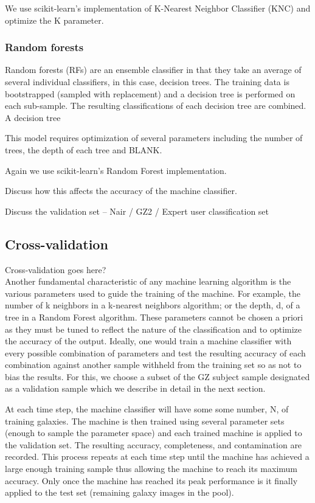 \documentclass[twocolumn]{aastex6}
\begin{document}
We use scikit-learn's implementation of K-Nearest Neighbor Classifier (KNC) and optimize the K parameter. 

\subsubsection{Random forests}
Random forests (RFs) are an ensemble classifier in that they take an average of several individual classifiers, in this case, decision trees. The training data is bootstrapped (sampled with replacement) and a decision tree is performed on each sub-sample. The resulting classifications of each decision tree are combined. A decision tree 


This model requires optimization of several parameters including the number of trees, the depth of each tree and BLANK. 

Again we use scikit-learn's Random Forest implementation. 


Discuss how this affects the accuracy of the machine classifier. 

Discuss the validation set -- Nair / GZ2 / Expert user classification set


\subsection{Cross-validation}
Cross-validation goes here? \\
Another fundamental characteristic of any machine learning algorithm is the various parameters used to guide the training of the machine. For example, the number of k neighbors in a k-nearest neighbors algorithm; or the depth, d, of a tree in a Random Forest algorithm. These parameters cannot be chosen a priori as they must be tuned to reflect the nature of the classification and to optimize the accuracy of the output. Ideally, one would train a machine classifier with every possible combination of parameters and test the resulting accuracy of each combination against another sample withheld from the training set so as not to bias the results. For this, we choose a subset of the GZ subject sample designated as a validation sample which we describe in detail in the next section. 


At each time step, the machine classifier will have some some number, N, of training galaxies. The machine is then trained using several parameter sets (enough to sample the parameter space) and each trained machine is applied to the validation set. The resulting accuracy, completeness, and contamination are recorded. This process repeats at each time step until the machine has achieved a large enough training sample thus allowing the machine to reach its maximum accuracy. Only once the machine has reached its peak performance is it finally applied to the test set (remaining galaxy images in the pool). 
\end{document}
